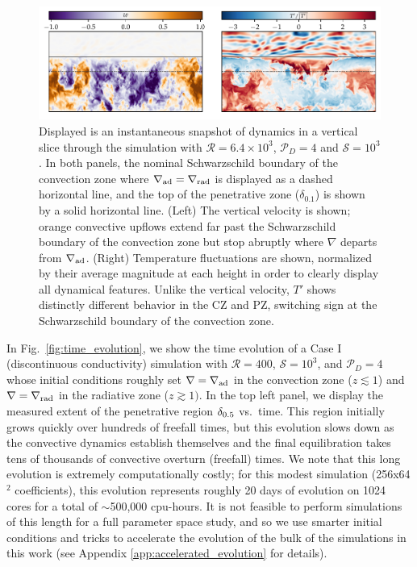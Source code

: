 \documentclass[twocolumn]{aastex631}
\newcommand{\gradrad}{\ensuremath{\nabla_{\rm{rad}}}}
\newcommand{\gradad}{\ensuremath{\nabla_{\rm{ad}}}}
\newcommand{\justgrad}{\ensuremath{\nabla}}
\newcommand{\mP}{\ensuremath{\mathcal{P}}}
\newcommand{\mR}{\ensuremath{\mathcal{R}}}
\newcommand{\mS}{\ensuremath{\mathcal{S}}}
\begin{document}
\begin{figure}[t]
\centering
\includegraphics[width=\textwidth]{vertical_dynamics_panels.pdf}
\caption{
Displayed is an instantaneous snapshot of dynamics in a vertical slice through the simulation with $\mR = 6.4 \times 10^3$, $\mP_D = 4$ and $\mS = 10^3$.
In both panels, the nominal Schwarzschild boundary of the convection zone where $\gradad = \gradrad$ is displayed as a dashed horizontal line, and the top of the penetrative zone ($\delta_{0.1}$) is shown by a solid horizontal line.
(Left) The vertical velocity is shown; orange convective upflows extend far past the Schwarzschild boundary of the convection zone but stop abruptly where $\justgrad$ departs from $\gradad$.
(Right) Temperature fluctuations are shown, normalized by their average magnitude at each height in order to clearly display all dynamical features.
Unlike the vertical velocity, $T'$ shows distinctly different behavior in the CZ and PZ, switching sign at the Schwarzschild boundary of the convection zone.
\label{fig:vertical_dynamics_panels}
}
\end{figure}

In Fig.~\ref{fig:time_evolution}, we show the time evolution of a Case I (discontinuous conductivity) simulation with $\mR = 400$, $\mS = 10^3$, and $\mP_D = 4$ whose initial conditions roughly set $\justgrad = \gradad$ in the convection zone ($z \lesssim 1$) and $\justgrad = \gradrad$ in the radiative zone ($z \gtrsim 1)$.
In the top left panel, we display the measured extent of the penetrative region $\delta_{\rm{0.5}}$ vs.~time.
This region initially grows quickly over hundreds of freefall times, but this evolution slows down as the convective dynamics establish themselves and the final equilibration takes tens of thousands of convective overturn (freefall) times.
We note that this long evolution is extremely computationally costly; for this modest simulation (256x64$^2$ coefficients), this evolution represents roughly 20 days of evolution on 1024 cores for a total of $\sim$500,000 cpu-hours.
It is not feasible to perform simulations of this length for a full parameter space study, and so we use smarter initial conditions and tricks to accelerate the evolution of the bulk of the simulations in this work (see Appendix \ref{app:accelerated_evolution} for details).
\end{document}
